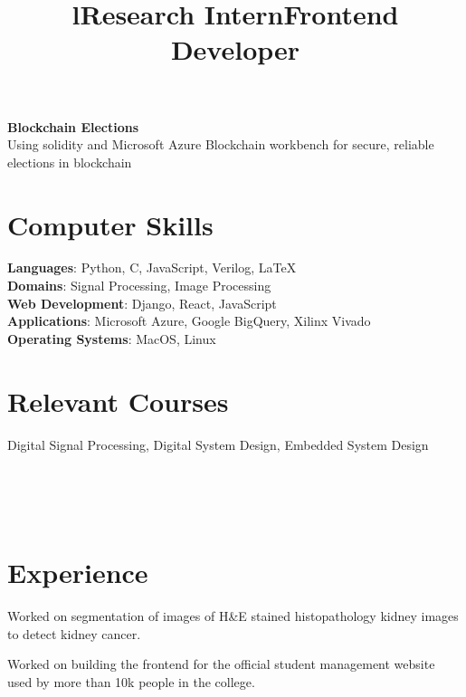 \documentclass[margin]{res}
\begin{document}
\begin{resume}
      \par
      \textbf{Blockchain Elections}\\
      Using solidity and Microsoft Azure Blockchain workbench for secure, reliable elections in blockchain

    \section{Computer Skills}
      \textbf{Languages}: Python, C, JavaScript, Verilog, \LaTeX
      \\
      \textbf{Domains}: Signal Processing, Image Processing
      \\
      \textbf{Web Development}: Django, React, JavaScript
      \\
      \textbf{Applications}: Microsoft Azure, Google BigQuery, Xilinx Vivado
      \\
      \textbf{Operating Systems}: MacOS, Linux

    \section{Relevant Courses}
      Digital Signal Processing, Digital System Design, Embedded System Design

    \begin{format}
      \title{l}\\
      \\
      \body\\
    \end{format}

    \section{Experience}
      \title{\textbf{Research Intern}}
      \begin{position}
        Worked on segmentation of images of H\&E stained histopathology kidney images to detect kidney cancer.
      \end{position}

      \title{\textbf{Frontend Developer}}
      \begin{position}
        Worked on building the frontend for the official student management website used by more than 10k people in the college.
      \end{position}


\end{resume}
\end{document}
